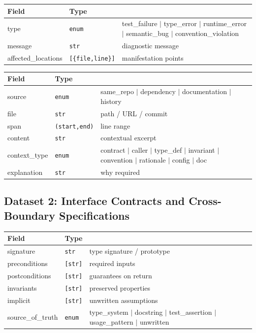 \documentclass[a4paper,12pt]{article}
\begin{document}
\begin{tcolorbox}[title=FailureSignal]
\footnotesize
\begin{tabularx}{\linewidth}{@{} l l Y @{}}
\toprule
\textbf{Field} & \textbf{Type} & \\
\midrule
type & \texttt{enum} & test\_failure $\mid$ type\_error $\mid$ runtime\_error $\mid$ semantic\_bug $\mid$ convention\_violation \\
message & \texttt{str} & diagnostic message \\
affected\_locations & \texttt{[\{file,line\}]} & manifestation points \\
\bottomrule
\end{tabularx}
\end{tcolorbox}

\begin{tcolorbox}[title=MissingContext]
\footnotesize
\begin{tabularx}{\linewidth}{@{} l l Y @{}}
\toprule
\textbf{Field} & \textbf{Type} & \\
\midrule
source & \texttt{enum} & same\_repo $\mid$ dependency $\mid$ documentation $\mid$ history \\
file & \texttt{str} & path / URL / commit \\
span & \texttt{(start,end)} & line range \\
content & \texttt{str} & contextual excerpt \\
context\_type & \texttt{enum} & contract $\mid$ caller $\mid$ type\_def $\mid$ invariant $\mid$ convention $\mid$ rationale $\mid$ config $\mid$ doc \\
explanation & \texttt{str} & why required \\
\bottomrule
\end{tabularx}
\end{tcolorbox}

\subsection{Dataset 2: Interface Contracts and Cross-Boundary
Specifications}

\begin{tcolorbox}[title=Contract]
\footnotesize
\begin{tabularx}{\linewidth}{@{} l l Y @{}}
\toprule
\textbf{Field} & \textbf{Type} & \\
\midrule
signature & \texttt{str} & type signature / prototype \\
preconditions & \texttt{[str]} & required inputs \\
postconditions & \texttt{[str]} & guarantees on return \\
invariants & \texttt{[str]} & preserved properties \\
implicit & \texttt{[str]} & unwritten assumptions \\
source\_of\_truth & \texttt{enum} & type\_system $\mid$ docstring $\mid$ test\_assertion $\mid$ usage\_pattern $\mid$ unwritten \\
\bottomrule
\end{tabularx}
\end{tcolorbox}
\end{document}
